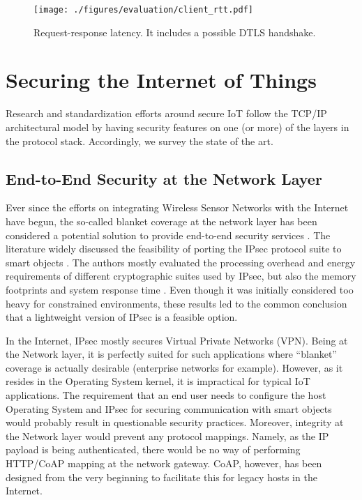 \documentclass[conference]{IEEEtran}
\begin{document}
\begin{figure}[htbp]
\centering
\texttt{[image: ./figures/evaluation/client\_rtt.pdf]}
\caption{Request-response latency. It includes a possible DTLS handshake.}
\label{client-rtt}
\end{figure}


\section{Securing the Internet of Things} \label{relatedwork}

Research and standardization efforts around secure IoT follow the TCP/IP architectural model by having security features on one (or more) of the layers in the protocol stack. Accordingly, we survey the state of the art.








\subsection{End-to-End Security at the Network Layer}
\label{ipsec}




Ever since the efforts on integrating Wireless Sensor Networks with the Internet
have begun, the so-called blanket coverage at the network layer has been
considered a potential solution to provide end-to-end security services
\cite{minisec}.  The literature widely discussed the feasibility of porting the
IPsec protocol suite to smart objects \cite{granjal2008ipsec,
  roman2009integrating, granjal2010secure, raza2011securing, raza2012journal,
  granjal2012effectiveness}. The authors mostly evaluated the processing overhead and energy requirements of different cryptographic suites used by IPsec, but also the memory footprints and system response time \cite{raza2011securing, raza2012journal}. Even though it was initially considered too heavy for constrained environments, these results led to the common conclusion that a lightweight version of IPsec is a feasible option.



In the Internet, IPsec mostly secures Virtual Private Networks (VPN). Being at
the Network layer, it is perfectly suited for such applications where
``blanket'' coverage is actually desirable (enterprise networks for
example). However, as it resides in the Operating System kernel, it is
impractical for typical IoT applications. The requirement that an end user needs
to configure the host Operating System and IPsec for securing communication with
smart objects would probably result in questionable security practices. 
Moreover, integrity at the Network layer would prevent any protocol mappings. Namely, as the IP payload is being authenticated, there would be no way of performing HTTP/CoAP mapping at the network gateway. CoAP, however, has been designed from the very beginning to facilitate this for legacy hosts in the Internet.
\end{document}
